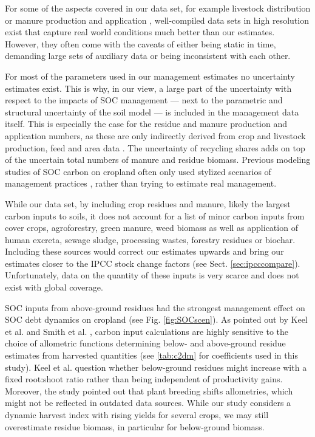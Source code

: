 \documentclass[gc, manuscript]{copernicus}
\begin{document}
For some of the aspects covered in our data set, for example livestock distribution \citep{robinson_mapping_2014} or manure production and application \citep{zhang_global_2017}, well-compiled data sets in high resolution exist that capture real world conditions much better than our estimates. However, they often come with the caveats of either being static in time, demanding large sets of auxiliary data or being inconsistent with each other.

For most of the parameters used in our management estimates no uncertainty estimates exist. This is why, in our view, a large part of the uncertainty with respect to the impacts of SOC management --- next to the parametric and structural uncertainty of the soil model --- is included in the management data itself. This is especially the case for the residue and manure production and application numbers, as these are only indirectly derived from crop and livestock production, feed and area data \citep{faostat_faostat_2016, weindl_livestock_2017}. The uncertainty of recycling shares adds on top of the uncertain total numbers of manure and residue biomass. Previous modeling studies of SOC carbon on cropland often only used stylized scenarios of management practices \citep{pugh_simulated_2015, lutz_simulating_2019}, rather than trying to estimate real management.

While our data set, by including crop residues and manure, likely the largest carbon inputs to soils, it does not account for a list of minor carbon inputs from cover crops, agroforestry, green manure, weed biomass as well as application of human excreta, sewage sludge, processing wastes, forestry residues or biochar. Including these sources would correct our estimates upwards and bring our estimates closer to the IPCC stock change factors (see Sect. \ref{sec:ipcccompare}). Unfortunately, data on the quantity of these inputs is very scarce and does not exist with global coverage.

SOC inputs from above-ground residues had the strongest management effect on SOC debt dynamics on cropland (see Fig. \ref{fig:SOCscen}). As pointed out by Keel et al. \citeyearpar{keel_large_2017} and Smith et al. \citeyearpar{smith_how_2020}, carbon input calculations are highly sensitive to the choice of allometric functions determining below- and above-ground residue estimates from harvested quantities (see \ref{tab:c2dm} for coefficients used in this study). Keel et al. \citeyearpar{keel_large_2017} question whether below-ground residues might increase with a fixed root:shoot ratio rather than being independent of productivity gains. Moreover, the study pointed out that plant breeding shifts allometries, which might not be reflected in outdated data sources. While our study considers a dynamic harvest index with rising yields for several crops, we may still overestimate residue biomass, in particular for below-ground biomass.
\end{document}
